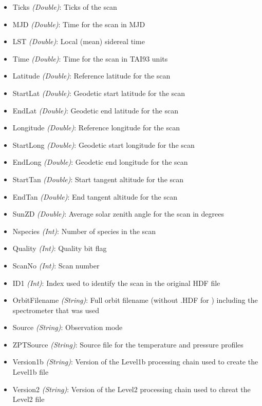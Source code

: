 \begin{itemize}
\begin{itemize}
            \item Ticks \emph{(Double)}: Ticks of the scan
            \item MJD \emph{(Double)}: Time for the scan in MJD
            \item LST \emph{(Double)}: Local (mean) sidereal time
            \item Time \emph{(Double)}: Time for the scan in TAI93 units
            \item Latitude \emph{(Double)}: Reference latitude for the scan
            \item StartLat \emph{(Double)}: Geodetic start latitude for the
                scan
            \item EndLat \emph{(Double)}: Geodetic end latitude for the scan
            \item Longitude \emph{(Double)}: Reference longitude for the scan
            \item StartLong \emph{(Double)}: Geodetic start longitude for the
                scan
            \item EndLong \emph{(Double)}: Geodetic end longitude for the scan
            \item StartTan \emph{(Double)}: Start tangent altitude for the scan
            \item EndTan \emph{(Double)}: End tangent altitude for the scan
            \item SunZD \emph{(Double)}: Average solar zenith angle for the
                scan in degrees
            \item Nspecies \emph{(Int)}: Number of species in the scan
            \item Quality \emph{(Int)}: Quality bit flag
            \item ScanNo \emph{(Int)}: Scan number
            \item ID1 \emph{(Int)}: Index used to identify the scan in the
                original HDF file
            \item OrbitFilename \emph{(String)}: Full orbit filename (without
                .HDF for ) including the spectrometer that was used
            \item Source \emph{(String)}: Observation mode
            \item ZPTSource \emph{(String)}: Source file for the temperature
                and pressure profiles
            \item Version1b \emph{(String)}: Version of the Level1b processing
                chain used to create the Level1b file
            \item Version2 \emph{(String)}: Version of the Level2 processing
                chain used to chreat the Level2 file
        \end{itemize}
\end{itemize}
